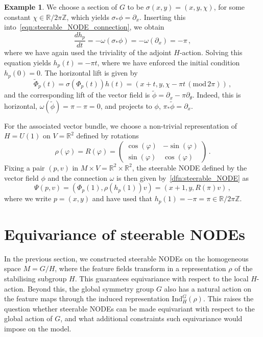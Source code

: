 \documentclass[12pt,a4paper]{article}
\numberwithin{equation}{section}
\newcommand{\R}{\mathbb{R}}
\newcommand{\Z}{\mathbb{Z}}
\theoremstyle{plain}
\theoremstyle{definition}
\newtheorem{example}[theorem]{Example}
\theoremstyle{remark}
\begin{document}
\begin{example}
    We choose a section of $G$ to be $\sigma(x,y)=(x,y,\chi)$, for some constant $\chi \in \R/2\pi\Z$, which yields $\sigma_* \phi = \partial_x$. Inserting this into~\eqref{eqn:steerable_NODE_connection}, we obtain
    \begin{equation}
        \frac{dh_p}{dt} = -\omega(\sigma_* \phi) = -\omega(\partial_x) = -\pi \,,
    \end{equation}
    where we have again used the triviality of the adjoint $H$-action. Solving this equation yields $h_p(t) = -\pi t$, where we have enforced the initial condition $h_p(0)=0$. The horizontal lift is given by
    \begin{equation}
        \tilde{\Phi}_p(t) = \sigma(\Phi_p(t))h(t) = (x+t,y,\chi-\pi t\,(\mathrm{mod}\, 2\pi)) \,,
    \end{equation}
    and the corresponding lift of the vector field is $\tilde{\phi} = \partial_x -\pi \partial_{\theta}$. Indeed, this is horizontal, $\omega(\tilde{\phi}) = \pi - \pi = 0$, and projects to $\phi$, $\pi_* \tilde{\phi} = \partial_x$.

    For the associated vector bundle, we choose a non-trivial representation of $H=U(1)$ on $V=\R^2$ defined by rotations
    \begin{equation}
        \rho(\varphi) = R(\varphi) = \left( \begin{array}{cc}
             \cos(\varphi) & -\sin(\varphi) \\
             \sin(\varphi) & \cos(\varphi) 
        \end{array}\right)\,.
    \end{equation}
    Fixing a pair $(p,v)$ in $M \times V = \R^2 \times \R^2$, the steerable NODE defined by the vector field $\phi$ and the connection $\omega$ is then given by~\cref{dfn:steerable_NODE} as
    \begin{equation}
        \Psi(p,v) = (\Phi_p(1),\rho(h_p(1))v) = (x+1,y,R(\pi)v)\,,
    \end{equation}
    where we write $p = (x,y)$ and have used that $h_p(1) = -\pi = \pi \in \R /2\pi \Z$.
\end{example}

\section{Equivariance of steerable NODEs}\label{sec:induced-equivariance}
In the previous section, we constructed steerable NODEs on the homogeneous space $M=G/H$, where the feature fields transform in a representation $\rho$ of the stabilising subgroup $H$. This guarantees equivariance with respect to the local $H$-action. Beyond this, the global symmetry group $G$ also has a natural action on the feature maps through the induced representation $\mathrm{Ind}_H^G(\rho)$. This raises the question whether steerable NODEs can be made equivariant with respect to the global action of $G$, and what additional constraints such equivariance would impose on the model.
\end{document}
